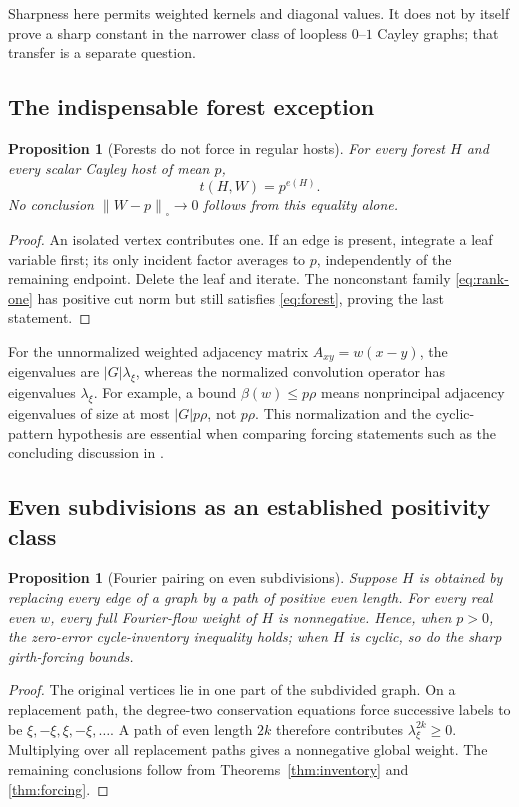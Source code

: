 \documentclass[11pt]{article}
\numberwithin{equation}{section}
\newtheorem{proposition}[theorem]{Proposition}
\theoremstyle{definition}
\theoremstyle{remark}
\newcommand{\Cut}[1]{\left\|#1\right\|_{\square}}
\begin{document}
Sharpness here permits weighted kernels and diagonal values. It does
not by itself prove a sharp constant in the narrower class of loopless
$0$--$1$ Cayley graphs; that transfer is a separate question.

\subsection{The indispensable forest exception}

\begin{proposition}[Forests do not force in regular hosts]
\label{prop:forest}
For every forest $H$ and every scalar Cayley host of mean $p$,
\begin{equation}
 t(H,W)=p^{e(H)}.
 \label{eq:forest}
\end{equation}
No conclusion $\Cut{W-p}\to0$ follows from this equality alone.
\end{proposition}
\begin{proof}
An isolated vertex contributes one. If an edge is present, integrate a
leaf variable first; its only incident factor averages to $p$,
independently of the remaining endpoint. Delete the leaf and iterate.
The nonconstant family \eqref{eq:rank-one} has positive cut norm but
still satisfies \eqref{eq:forest}, proving the last statement.
\end{proof}

For the unnormalized weighted adjacency matrix
$A_{xy}=w(x-y)$, the eigenvalues are $|G|\lambda_\xi$, whereas the
normalized convolution operator has eigenvalues $\lambda_\xi$.
For example, a bound $\beta(w)\leq p\rho$ means nonprincipal adjacency
eigenvalues of size at most $|G|p\rho$, not $p\rho$. This normalization
and the cyclic-pattern hypothesis are essential when comparing forcing
statements such as the concluding discussion in \cite{YuqiZhao}.

\subsection{Even subdivisions as an established positivity class}

\begin{proposition}[Fourier pairing on even subdivisions]
\label{prop:subdivision}
Suppose $H$ is obtained by replacing every edge of a graph by a path
of positive even length. For every real even $w$, every full Fourier-flow
weight of $H$ is nonnegative. Hence, when $p>0$, the zero-error
cycle-inventory inequality holds; when $H$ is cyclic, so do the sharp
girth-forcing bounds.
\end{proposition}
\begin{proof}
The original vertices lie in one part of the subdivided graph. On a
replacement path, the degree-two conservation equations force
successive labels to be $\xi,-\xi,\xi,-\xi,\ldots$. A path of even
length $2k$ therefore contributes $\lambda_\xi^{2k}\geq0$. Multiplying
over all replacement paths gives a nonnegative global weight. The
remaining conclusions follow from Theorems~\ref{thm:inventory} and
\ref{thm:forcing}.
\end{proof}
\end{document}
